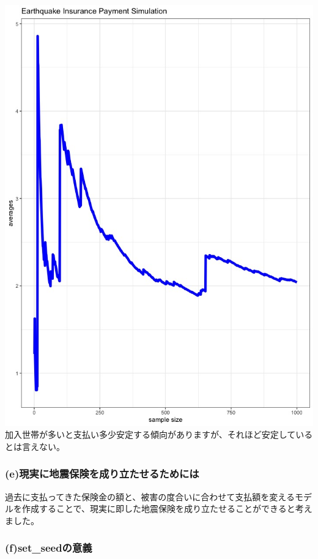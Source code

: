 \documentclass[
]{article}
\begin{document}
\includegraphics{./result/earthquake-insurance-payment-simulation.jpeg}
加入世帯が多いと支払い多少安定する傾向がありますが、それほど安定しているとは言えない。

\hypertarget{eux73feux5b9fux306bux5730ux9707ux4fddux967aux3092ux6210ux308aux7acbux305fux305bux308bux305fux3081ux306bux306f}{%
\subsubsection{(e)現実に地震保険を成り立たせるためには}\label{eux73feux5b9fux306bux5730ux9707ux4fddux967aux3092ux6210ux308aux7acbux305fux305bux308bux305fux3081ux306bux306f}}

過去に支払ってきた保険金の額と、被害の度合いに合わせて支払額を変えるモデルを作成することで、現実に即した地震保険を成り立たせることができると考えました。

\hypertarget{fset_seedux306eux610fux7fa9}{%
\subsubsection{(f)set\_seedの意義}\label{fset_seedux306eux610fux7fa9}}
\end{document}
